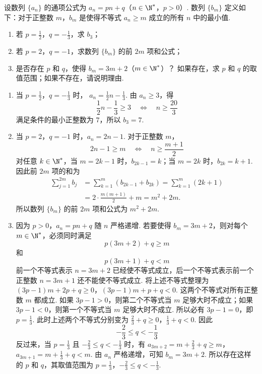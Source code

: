 \begin{problem}
设数列 \(\{a_{n}\}\) 的通项公式为 \(a_{n} = pn + q\)（\(n \in \N^{*}\)，\(p > 0\)）. 数列 \(\{b_{m}\}\) 定义如下：对于正整数 \(m\)，\(b_{m}\) 是使得不等式 \(a_{n} \geqslant m\) 成立的所有 \(n\) 中的最小值.
\begin{enumerate}
\item 若 \(p = \frac{1}{2}\)，\(q = -\frac{1}{3}\)，求 \(b_{3}\)；
\item 若 \(p = 2\)，\(q = -1\)，求数列 \(\{b_m\}\) 的前 \(2m\) 项和公式；
\item 是否存在 \(p\) 和 \(q\)，使得 \(b_{m} = 3m + 2\)（\(m \in \N^{*}\)）？ 如果存在，求 \(p\) 和 \(q\) 的取值范围；如果不存在，请说明理由.
\end{enumerate}

\begin{solution}
\begin{enumerate}
\item 当 \(p=\frac{1}{2}\)，\(q=-\frac{1}{3}\) 时，
\(a_n=\frac{1}{2}n-\frac{1}{3}\).
由 \(a_n\geqslant3\)，得
\[
\frac{1}{2}n-\frac{1}{3}\geqslant3
\quad\Longleftrightarrow\quad
n\geqslant\frac{20}{3}
\]
满足条件的最小正整数为 \(7\)，所以 \(b_3=7\).

\item 当 \(p=2\)，\(q=-1\) 时，\(a_n=2n-1\).
对于正整数 \(m\)，
\[
2n-1\geqslant m
\quad\Longleftrightarrow\quad
n\geqslant\frac{m+1}{2}
\]
对任意 \(k\in\N^*\)，当 \(m=2k-1\) 时，\(b_{2k-1}=k\)；当 \(m=2k\) 时，\(b_{2k}=k+1\).
因此前 \(2m\) 项的和为
\[
\begin{aligned}
\sum_{j=1}^{2m}b_j
&=\sum_{k=1}^{m}\left(b_{2k-1}+b_{2k}\right)
=\sum_{k=1}^{m}(2k+1)\\
&=2\cdot\frac{m(m+1)}{2}+m=m^2+2m.
\end{aligned}
\]
所以数列 \(\{b_m\}\) 的前 \(2m\) 项和公式为 \(m^2+2m\).

\item 因为 \(p>0\)，\(a_n=pn+q\) 随 \(n\) 严格递增.
若要使得 \(b_m=3m+2\)，则对每个 \(m\in\N^*\)，必须同时满足
\[
p(3m+2)+q\geqslant m
\]
和
\[
p(3m+1)+q<m
\]
前一个不等式表示 \(n=3m+2\) 已经使不等式成立，后一个不等式表示前一个正整数 \(n=3m+1\) 还不能使不等式成立.
将上述不等式整理为
\((3p-1)m+2p+q\geqslant0\)，\((3p-1)m+p+q<0\).
这两个不等式对所有正整数 \(m\) 都成立.
如果 \(3p-1>0\)，则第二个不等式当 \(m\) 足够大时不成立；如果 \(3p-1<0\)，则第一个不等式当 \(m\) 足够大时不成立.
所以必有 \(3p-1=0\)，即 \(p=\frac{1}{3}\).
此时上述两个不等式分别变为
\(\frac{2}{3}+q\geqslant0\)，\(\frac{1}{3}+q<0\).
因此
\[
-\frac{2}{3}\leqslant q< -\frac{1}{3}
\]
反过来，当 \(p=\frac{1}{3}\) 且 \(-\frac{2}{3}\leqslant q< -\frac{1}{3}\) 时，有
\(a_{3m+2}=m+\frac{2}{3}+q\geqslant m\)，\(a_{3m+1}=m+\frac{1}{3}+q<m\).
由 \(a_n\) 严格递增，可知 \(b_m=3m+2\).
所以存在这样的 \(p\) 和 \(q\)，其取值范围为
\(p=\frac{1}{3}\)，\(-\frac{2}{3}\leqslant q< -\frac{1}{3}\).
\end{enumerate}
\end{solution}
\end{problem}
